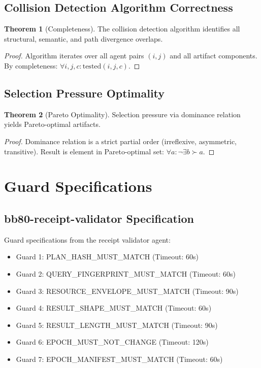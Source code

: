 \documentclass[12pt,oneside,a4paper]{book}
\theoremstyle{definition}
\newtheorem{theorem}{Theorem}[chapter]
\begin{document}
\section{Collision Detection Algorithm Correctness}
\label{app:collision-proofs}

\begin{theorem}[Completeness]
The collision detection algorithm identifies all structural, semantic, and path divergence overlaps.

\begin{proof}
Algorithm iterates over all agent pairs $(i,j)$ and all artifact components.
By completeness: $\forall i, j, c: \text{tested}(i,j,c)$.
\end{proof}
\end{theorem}

\section{Selection Pressure Optimality}
\label{app:selection-pressure-proofs}

\begin{theorem}[Pareto Optimality]
Selection pressure via dominance relation yields Pareto-optimal artifacts.

\begin{proof}
Dominance relation is a strict partial order (irreflexive, asymmetric, transitive).
Result is element in Pareto-optimal set: $\forall a: \neg \exists b \succ a$.
\end{proof}
\end{theorem}

\chapter{Guard Specifications}
\label{app:guards}


\section{bb80-receipt-validator Specification}
\label{app:guard-spec}

Guard specifications from the receipt validator agent:
\begin{itemize}
  \item Guard 1: PLAN\_HASH\_MUST\_MATCH (Timeout: 60s)
  \item Guard 2: QUERY\_FINGERPRINT\_MUST\_MATCH (Timeout: 60s)
  \item Guard 3: RESOURCE\_ENVELOPE\_MUST\_MATCH (Timeout: 90s)
  \item Guard 4: RESULT\_SHAPE\_MUST\_MATCH (Timeout: 60s)
  \item Guard 5: RESULT\_LENGTH\_MUST\_MATCH (Timeout: 90s)
  \item Guard 6: EPOCH\_MUST\_NOT\_CHANGE (Timeout: 120s)
  \item Guard 7: EPOCH\_MANIFEST\_MUST\_MATCH (Timeout: 60s)
\end{itemize}
\end{document}
